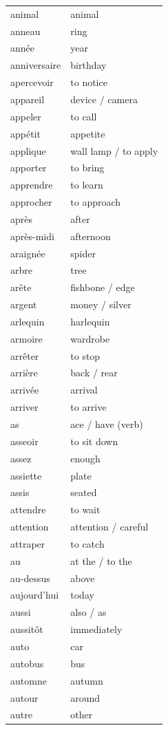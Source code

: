 \documentclass[12pt,a4paper]{article}
\begin{document}
\begin{longtable}{p{4cm} p{6cm}}
animal & animal \\
anneau & ring \\
année & year \\
anniversaire & birthday \\
apercevoir & to notice \\
appareil & device / camera \\
appeler & to call \\
appétit & appetite \\
applique & wall lamp / to apply \\
apporter & to bring \\
apprendre & to learn \\
approcher & to approach \\
après & after \\
après-midi & afternoon \\
araignée & spider \\
arbre & tree \\
arête & fishbone / edge \\
argent & money / silver \\
arlequin & harlequin \\
armoire & wardrobe \\
arrêter & to stop \\
arrière & back / rear \\
arrivée & arrival \\
arriver & to arrive \\
as & ace / have (verb) \\
asseoir & to sit down \\
assez & enough \\
assiette & plate \\
assis & seated \\
attendre & to wait \\
attention & attention / careful \\
attraper & to catch \\
au & at the / to the \\
au-dessus & above \\
aujourd'hui & today \\
aussi & also / as \\
aussitôt & immediately \\
auto & car \\
autobus & bus \\
automne & autumn \\
autour & around \\
autre & other \\

\end{longtable}
\end{document}
